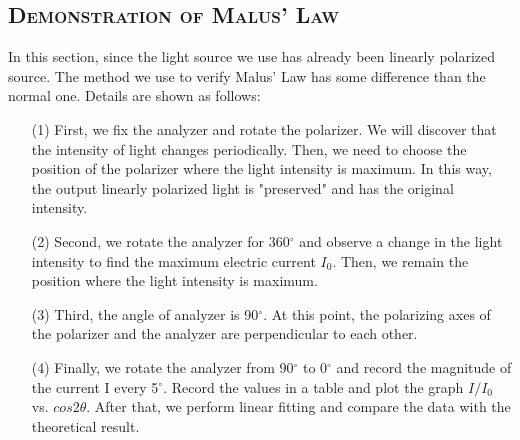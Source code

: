 \documentclass[a4paper,12pt]{article}
\begin{document}
\subsection{\textsc{Demonstration of Malus’ Law}}
In this section, since the light source we use has already been linearly polarized source. The method we use to verify Malus' Law has some difference than the normal one. Details are shown as follows:
\begin{itemize}
\item[(1)] First, we fix the analyzer and rotate the polarizer. We will discover that the intensity of light changes periodically. Then, we need to choose the position of the polarizer where the light intensity is maximum. In this way, the output linearly polarized light is "preserved" and has the original intensity.

\item[(2)] Second, we rotate the analyzer for 360$^{\circ}$ and observe a change in the light intensity to find the maximum electric current $I_0$. Then, we remain the position where the light intensity is maximum.

\item[(3)] Third, the angle of analyzer is 90$^{\circ}$. At this point, the polarizing axes of the polarizer and the analyzer are perpendicular to each other.

\item[(4)] Finally, we rotate the analyzer from 90$^{\circ}$ to 0$^{\circ}$ and record the magnitude of the current I every 5$^{\circ}$. Record the values in a table and plot the graph $I/I_0$ vs. $cos2 \theta$. After that, we perform linear fitting and compare the data with the theoretical result.
\end{itemize}
\end{document}

